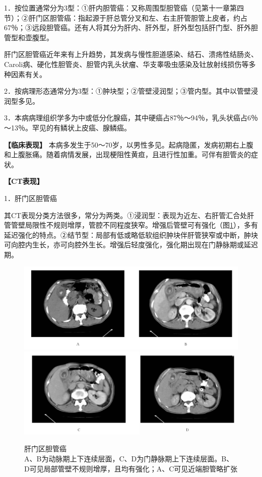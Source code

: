 1．按位置通常分为3型：①肝内胆管癌：又称周围型胆管癌（见第十一章第四节）；②肝门区胆管癌：指起源于肝总管分叉和左、右主肝管胆管上皮者，约占67％；③远段胆管癌。还有人将其分为肝内、肝外型，肝外型包括肝门型、肝外胆管型和壶腹型。

肝门区胆管癌近年来有上升趋势，其发病与慢性胆道感染、结石、溃疡性结肠炎、Caroli病、硬化性胆管炎、胆管内乳头状瘤、华支睾吸虫感染及钍放射线损伤等多种因素有关。

2．按病理形态通常分为3型：①肿块型；②管壁浸润型；③管内型。其中以管壁浸润型多见。

3．本病病理组织学多为中或低分化腺癌，其中硬癌占87％～94％，乳头状癌占6％～13％。罕见的有鳞状上皮癌、腺鳞癌。

\textbf{【临床表现】}
本病多发生于50～70岁，以男性多见。起病隐匿，发病初期右上腹和上腹胀痛。随着病情发展，出现梗阻性黄疸，且进行性加重。可伴有胆管炎的症状。

\textbf{【CT表现】}

1．肝门区胆管癌

其CT表现分类方法很多，常分为两类。①浸润型：表现为近左、右肝管汇合处肝管管壁局限性不规则增厚，管腔不同程度狭窄。增强后管壁可有强化（图\ref{fig12-8}），多有延迟强化的特点。②结节型：局部有低或略低软组织肿块伴肝管狭窄或中断，肿块可向腔内生长，亦可向腔外生长。增强后轻度强化，强化期出现在门静脉期或延迟期。



\begin{figure}[!htbp]
 \centering
 \includegraphics[width=.7\textwidth,height=\textheight,keepaspectratio]{./images/Image00298.jpg}
 \includegraphics[width=.7\textwidth,height=\textheight,keepaspectratio]{./images/Image00299.jpg}
 \captionsetup{justification=centering}
 \caption{肝门区胆管癌\\{\small A、B为动脉期上下连续层面，C、D为门静脉期上下连续层面。B、D可见局部管壁不规则增厚，且均有强化；A、C可见近端胆管略扩张}}
 \label{fig12-8}
  \end{figure} 

